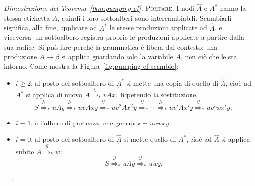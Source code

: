 \documentclass[a4paper, 11pt, oneside]{book}
\theoremstyle{formale}
\begin{document}
\begin{proof}[Dimostrazione del Teorema~\ref{thm:pumping-cf}]
        \textsc{Pompare}. I nodi $\hat{A}$ e $A^*$ hanno la stessa etichetta $A$, quindi
        i loro sottoalberi sono intercambiabili. Scambiarli significa, alla fine, applicare
        ad $A^*$ le stesse produzioni applicate ad $\hat{A}$, e viceversa: un sottoalbero
        registra proprio le produzioni applicate a partire dalla sua radice. Si pu\`o fare
        perch\'e la grammatica \`e libera dal contesto: una produzione $A \to \beta$ si
        applica guardando solo la variabile $A$, non ci\`o che le sta intorno. Come mostra
        la Figura~\ref{fig:pumping-cf-scambio}:
        \begin{itemize}
            \item $i \geq 2$: al posto del sottoalbero di $A^*$ si mette una copia di
                quello di $\hat{A}$, cio\`e ad $A^*$ si applica di nuovo $A \overset{\mathcal{G}}{\Rightarrow}_* vAx$. Ripetendo la
                sostituzione,
                \begin{equation*}
                    S \overset{\mathcal{G}}{\Rightarrow}_* uAy
                    \overset{\mathcal{G}}{\Rightarrow}_* uvAxy
                    \overset{\mathcal{G}}{\Rightarrow}_* uv^2Ax^2y
                    \overset{\mathcal{G}}{\Rightarrow}_* \cdots
                    \overset{\mathcal{G}}{\Rightarrow}_* uv^iAx^iy
                    \overset{\mathcal{G}}{\Rightarrow}_* uv^iwx^iy;
                \end{equation*}
            \item $i = 1$: \`e l'albero di partenza, che genera $z = uvwxy$;
            \item $i = 0$: al posto del sottoalbero di $\hat{A}$ si mette quello di
                $A^*$, cio\`e ad $\hat{A}$ si applica subito
                $A \overset{\mathcal{G}}{\Rightarrow}_* w$:
                \begin{equation*}
                    S \overset{\mathcal{G}}{\Rightarrow}_* uAy
                    \overset{\mathcal{G}}{\Rightarrow}_* uwy.
                \end{equation*}
        \end{itemize}


\end{proof}
\end{document}

